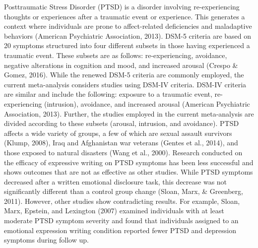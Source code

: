 \documentclass[english,man, mask]{apa6}
\theoremstyle{definition}
\theoremstyle{definition}
\theoremstyle{definition}
\theoremstyle{remark}
\begin{document}
Posttraumatic Stress Disorder (PTSD) is a disorder involving
re-experiencing thoughts or experiences after a traumatic event or
experience. This generates a context where individuals are prone to
affect-related deficiencies and maladaptive behaviors (American
Psychiatric Association, 2013). DSM-5 criteria are based on 20 symptoms
structured into four different subsets in those having experienced a
traumatic event. These subsets are as follows: re-experiencing,
avoidance, negative alterations in cognition and mood, and increased
arousal (Crespo \& Gomez, 2016). While the renewed DSM-5 criteria are
commonly employed, the current meta-analysis considers studies using
DSM-IV criteria. DSM-IV criteria are similar and include the following:
exposure to a traumatic event, re-experiencing (intrusion), avoidance,
and increased arousal (American Psychiatric Association, 2013). Further,
the studies employed in the current meta-analysis are divided according
to these subsets (arousal, intrusion, and avoidance). PTSD affects a
wide variety of groups, a few of which are sexual assault survivors
(Klump, 2008), Iraq and Afghanistan war veterans (Gentes et al., 2014),
and those exposed to natural disasters (Wang et al., 2000). Research
conducted on the efficacy of expressive writing on PTSD symptoms has
been less successful and shows outcomes that are not as effective as
other studies. While PTSD symptoms decreased after a written emotional
disclosure task, this decrease was not significantly different than a
control group change (Sloan, Marx, \& Greenberg, 2011). However, other
studies show contradicting results. For example, Sloan, Marx, Epstein,
and Lexington (2007) examined individuals with at least moderate PTSD
symptom severity and found that individuals assigned to an emotional
expression writing condition reported fewer PTSD and depression symptoms
during follow up.
\end{document}

